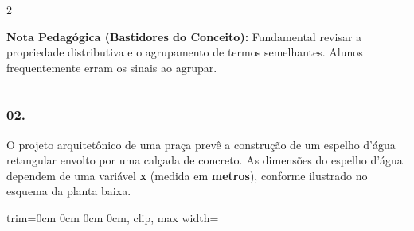 \begin{multicols*}{2}
    \begin{boxexplicacao}
    \textbf{Nota Pedagógica (Bastidores do Conceito):} Fundamental revisar a propriedade distributiva e o agrupamento de termos semelhantes. Alunos frequentemente erram os sinais ao agrupar.
    \end{boxexplicacao}
\fi

\par\vspace{\espacoQuestao}

\noindent\textcolor{CorLinha}{\rule{\linewidth}{0.5pt}} 
\par\vspace{\espacoPreQuestao}
\subsubsection*{02.} 
\begin{enunciadoLiteral}
O projeto arquitetônico de uma praça prevê a construção de um espelho d'água retangular envolto por uma calçada de concreto. As dimensões do espelho d'água dependem de uma variável \textbf{x} (medida em \textbf{metros}), conforme ilustrado no esquema da planta baixa.

\begin{center}
\begin{adjustbox}{trim=0cm 0cm 0cm 0cm, clip, max width=\larguraTikz}
\end{adjustbox}
\end{center}
\end{enunciadoLiteral}
\end{multicols*}
